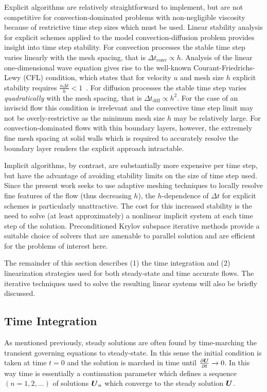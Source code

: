 Explicit algorithms are relatively straightforward to implement, but are not competitive for convection-dominated problems with non-negligible viscosity because of restrictive time step sizes which must be used.  Linear stability analysis for explicit schemes applied to the model convection-diffusion problem provides insight into time step stability. For convection processes the stable time step varies linearly with the mesh spacing, that is $\Delta t_\text{conv} \propto h$.  Analysis of the linear one-dimensional wave equation gives rise to the well-known Courant-Friedrichs-Lewy (CFL) condition, which states that for velocity $u$ and mesh size $h$ explicit stability requires $\frac{u \Delta t}{h} < 1$~\cite{cfmht}.   For diffusion processes the stable time step varies \emph{quadratically} with the mesh spacing, that is $\Delta t_\text{diff} \propto h^2$.   For the case of an inviscid flow this condition is irrelevant and the convective time step limit may not be overly-restrictive as the minimum mesh size $h$ may be relatively large.  For convection-dominated flows with thin boundary layers, however, the extremely fine mesh spacing at solid walls which is required to accurately resolve the boundary layer renders the explicit approach intractable. 

Implicit algorithms, by contrast, are substantially more expensive per time step, but have the advantage of avoiding stability limits on the size of time step used.  Since the present work seeks to use adaptive meshing techniques to locally resolve fine features of the flow (thus decreasing $h$), the $h$-dependence of $\Delta t$ for explicit schemes is particularly unattractive. The cost for this increased stability is the need to solve (at least approximately) a nonlinear implicit system at each time step of the solution.  Preconditioned Krylov subspace iterative methods provide a suitable choice of solvers that are amenable to parallel solution and are efficient for the problems of interest here.  

The remainder of this section describes (1) the time integration and (2) linearization strategies used for both steady-state and time accurate flows.  The iterative techniques used to solve the resulting linear systems will also be briefly discussed.

\subsection{Time Integration}
As mentioned previously, steady solutions are often found by time-marching the transient governing equations to steady-state.  In this sense the initial condition is taken at time $t=0$ and the solution is marched in time until ${\frac{\partial{{\boldsymbol{U}}}}{\partial{t}}}\rightarrow 0$.  In this way time is essentially a continuation parameter which defines a sequence $(n=1,2,\ldots)$ of solutions ${\boldsymbol{U}}_n$ which converge to the steady solution ${\boldsymbol{U}}$. 


